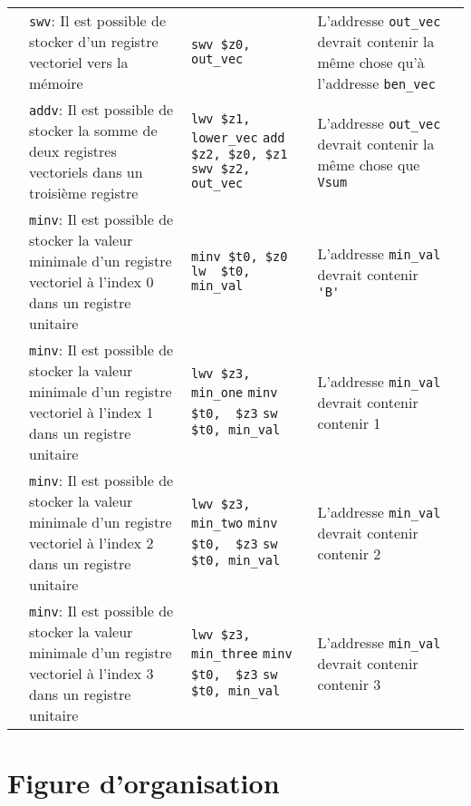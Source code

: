 \documentclass[a11paper]{article}
\newcommand{\cbox}{\fbox{\phantom{\ding{51}}}}
\newcounter{tid}
\newcommand{\tid}{\stepcounter{tid}\thetid}
\begin{document}
\begin{center}
\begin{longtable}{lp{5cm}p{4cm}p{4cm}l}
		\tid & \verb|swv|:
		Il est possible de stocker d'un registre vectoriel vers la mémoire &
		\verb|swv $z0, out_vec|                &
    L'addresse \verb|out_vec| devrait contenir la même chose qu'à
    l'addresse \verb|ben_vec| &
		\cbox
		\\

		\tid & \verb|addv|:
		Il est possible de stocker la somme de deux registres vectoriels dans un troisième
    registre &
		\verb|lwv $z1, lower_vec|
		\verb|add $z2, $z0, $z1|
		\verb|swv $z2, out_vec|
    &
    L'addresse \verb|out_vec| devrait contenir la même chose que \verb|Vsum|
    &
		\cbox
		\\

		\tid & \verb|minv|:
		Il est possible de stocker la valeur minimale d'un registre vectoriel à l'index 0 dans
    un registre unitaire &
		\verb|minv $t0, $z0|
		\verb|lw  $t0, min_val|
    &
    L'addresse \verb|min_val| devrait contenir \verb|'B'|
    &
		\cbox
		\\

		\tid & \verb|minv|:
		Il est possible de stocker la valeur minimale d'un registre vectoriel à l'index 1 dans
    un registre unitaire &
		\verb|lwv $z3, min_one|
		\verb|minv $t0,  $z3|
		\verb|sw  $t0, min_val|
    &
    L'addresse \verb|min_val| devrait contenir  contenir 1
    &
		\cbox
		\\

		\tid & \verb|minv|:
		Il est possible de stocker la valeur minimale d'un registre vectoriel à l'index 2 dans
    un registre unitaire &
		\verb|lwv $z3, min_two|
		\verb|minv $t0,  $z3|
		\verb|sw  $t0, min_val|
    &
    L'addresse \verb|min_val| devrait contenir  contenir 2
    &
		\cbox
		\\

		\tid & \verb|minv|:
		Il est possible de stocker la valeur minimale d'un registre vectoriel à l'index 3 dans
    un registre unitaire &
		\verb|lwv $z3, min_three|
		\verb|minv $t0,  $z3|
		\verb|sw  $t0, min_val|
    &
    L'addresse \verb|min_val| devrait contenir  contenir 3
    &
		\cbox
		\\

	\end{longtable}
\end{center}

\section{Figure d'organisation}
\end{document}
